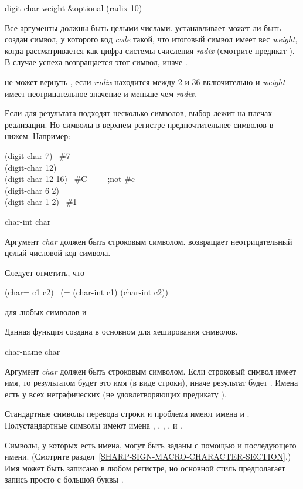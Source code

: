 \begin{defun}[Функция]
digit-char weight &optional (radix 10)

Все аргументы должны быть целыми числами.  устанавливает может
ли быть создан символ, у которого код \emph{code} такой, что итоговый символ
имеет вес \emph{weight}, когда рассматривается как цифра системы счисления
\emph{radix} (смотрите предикат ).
В случае успеха возвращается этот символ, иначе {\false}.

 не может вернуть {\false}, если \emph{radix} находится между 2
и 36 включительно и \emph{weight} имеет неотрицательное значение и меньше чем
\emph{radix}.

Если для результата подходят несколько символов, выбор лежит на плечах
реализации. Но символы в верхнем регистре предпочтительнее символов в нижем.
Например:
\begin{lisp}
(digit-char 7) \EV\ \#{\Xbackslash}7 \\
(digit-char 12) \EV\ {\false} \\
(digit-char 12 16) \EV\ \#{\Xbackslash}C~~~~~;\textrm{not} \#{\Xbackslash}c \\
(digit-char 6 2) \EV\ {\false} \\
(digit-char 1 2) \EV\ \#{\Xbackslash}1
\end{lisp}
\end{defun}

\begin{defun}[Функция]
char-int char

Аргумент \emph{char} должен быть строковым символом.
 возвращает неотрицательный целый числовой код символа.

Следует отметить, что
\begin{lisp}
(char= c1 c2) \EQ\ (= (char-int c1) (char-int c2))
\end{lisp}
для любых символов  и 

Данная функция создана в основном для хеширования символов.
\end{defun}

\begin{defun}[Функция]
char-name char

Аргумент \emph{char} должен быть строковым символом.
Если строковый символ имеет имя, то результатом будет это имя (в виде строки),
иначе результат будет {\false}. Имена есть у всех неграфических (не
удовлетворяющих предикату ).

Стандартные символы перевода строки и проблема имеют имена  и
.
Полустандартные символы имеют имена 
, , , ,  и .

Символы, у которых есть имена, могут быть заданы с помощью \cd{\#{\Xbackslash}}
и последующего имени. (Смотрите
раздел~\ref{SHARP-SIGN-MACRO-CHARACTER-SECTION}.)
Имя может быть записано в любом регистре, но основной стиль предполагает запись
просто с большой буквы .
\end{defun}

